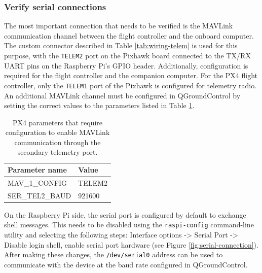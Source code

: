 \subsubsection{Verify serial connections}

The most important connection that needs to be verified is the MAVLink communication channel between the flight controller and the onboard computer. The custom connector described in Table \ref{tab:wiring-telem} is used for this purpose, with the \texttt{TELEM2} port on the Pixhawk board connected to the TX/RX UART pins on the Raspberry Pi's GPIO header. Additionally, configuration is required for the flight controller and the companion computer. For the PX4 flight controller, only the \texttt{TELEM1} port of the Pixhawk is configured for telemetry radio. An additional MAVLink channel must be configured in QGroundControl by setting the correct values to the parameters listed in Table \ref{tab:telem2-params}.

\begin{table}[h!]
 \begin{center}
  \begin{tabular}{l|l}
    Parameter name & Value \\ \hline
    MAV\_1\_CONFIG & TELEM2 \\
    SER\_TEL2\_BAUD & 921600 \\
  \end{tabular}
  \caption{PX4 parameters that require configuration to enable MAVLink communication through the secondary telemetry port.}
  \label{tab:telem2-params}
 \end{center}
\end{table}

On the Raspberry Pi side, the serial port is configured by default to exchange shell messages. This needs to be disabled using the \texttt{raspi-config} command-line utility and selecting the following steps: Interface options -> Serial Port -> Disable login shell, enable serial port hardware (see Figure \ref{fig:serial-connection}). After making these changes, the \texttt{/dev/serial0} address can be used to communicate with the device at the baud rate configured in QGroundControl.

